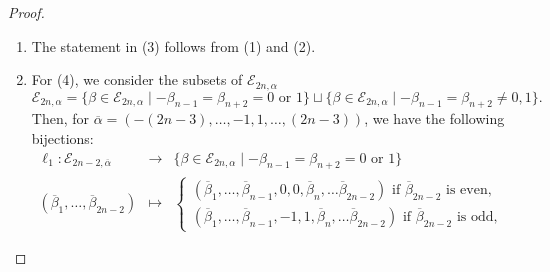 \documentclass[11pt,oneside]{amsart}
\theoremstyle{plain}
\theoremstyle{definition}
\theoremstyle{remark}
\newcommand{\tx}[1]{\text{#1}}
\newcommand{\CE}{{\mathcal E}}
\numberwithin{equation}{section}
\begin{document}
\begin{proof}
\begin{enumerate}
\begin{equation*}
\begin{array}{c}
					(d_1,\dots,d_n,d_{n+1},\dots,d_{2n}) \mapsto\\
					\left\lbrace \begin{array}{ll}
						\scalebox{0.85}{$
							(d_1+(2n-1-t),\dots,d_n+(2n-1-t),
							d_{n+1}-(2n-1-t),\dots,d_{2n}-(2n-1-t))
							$}& \tx{if }t\tx{ is odd},\\
						\scalebox{0.85}{$
							(d_1+(2n-t),\dots,d_n+(2n-t),
							d_{n+1}-(2n-t),\dots,d_{2n}-(2n-t))
							$}& \tx{if }t\tx{ is even}.
					\end{array}\right.
				\end{array}
			\end{equation*}
			Now, (2) follows from this bijection.
			
			\item The statement in (3) follows from (1) and (2).
			
			\item For (4), we consider the subsets of $\CE_{2n,\alpha}$
			\begin{equation*}
				\CE_{2n,\alpha}=\lbrace \beta \in \CE_{2n,\alpha} \mid -\beta_{n-1}=\beta_{n+2}=0 \tx{ or } 1 \rbrace \sqcup \lbrace \beta \in \CE_{2n,\alpha} \mid -\beta_{n-1}=\beta_{n+2}\neq 0,1 \rbrace.
			\end{equation*}
			Then, for $\overline{\alpha}=(-(2n-3),\dots,-1,1,\dots,(2n-3))$, we have the following bijections:
			\begin{equation*}\begin{array}{ccl}
					\ell_1:\CE_{2n-2,\overline{\alpha}} & \rightarrow & \lbrace \beta \in \CE_{2n,\alpha} \mid -\beta_{n-1}=\beta_{n+2}=0 \tx{ or } 1 \rbrace\\
					(\overline{\beta}_1,\dots,\overline{\beta}_{2n-2}) & \mapsto & \left\lbrace \begin{array}{l}
						(\overline{\beta}_1,\dots,\overline{\beta}_{n-1},0,0,\overline{\beta}_n,\dots\overline{\beta}_{2n-2}) \tx{ if } \overline{\beta}_{2n-2} \tx{ is even},\\ (\overline{\beta}_1,\dots,\overline{\beta}_{n-1},-1,1,\overline{\beta}_n,\dots\overline{\beta}_{2n-2}) \tx{ if } \overline{\beta}_{2n-2} \tx{ is odd},
					\end{array}\right.
				\end{array}
			\end{equation*}
			

\end{enumerate}
\end{proof}
\end{document}
